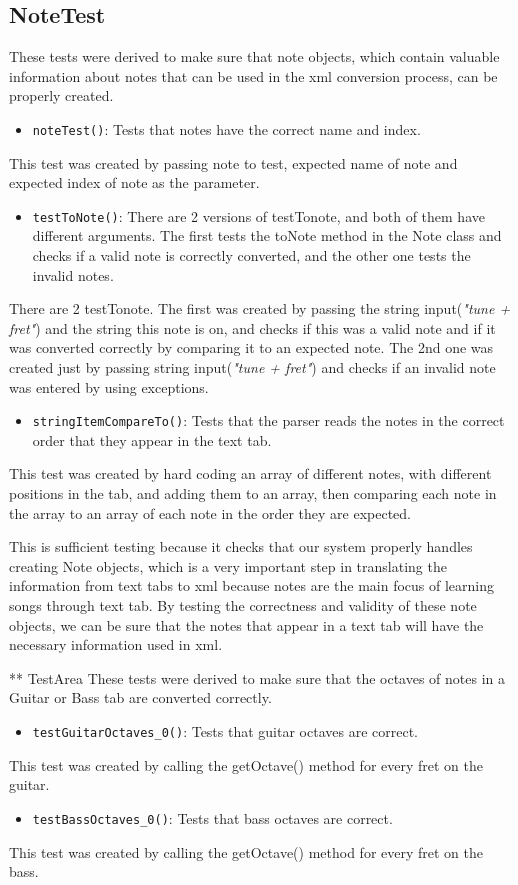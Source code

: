 \documentclass[11pt]{article}
\begin{document}
\subsection{NoteTest}
\label{sec:org2520dad}
These tests were derived to make sure that note objects, which contain valuable information about notes that can be used in the xml conversion process, can be properly created. 
\begin{itemize}
\item \texttt{noteTest()}: Tests that notes have the correct name and index.
\end{itemize}
This test was created by passing note to test, expected name of note and expected index of note as the parameter.
\begin{itemize}
\item \texttt{testToNote()}: There are 2 versions of testTonote, and both of them have different arguments. The first tests the toNote method in the Note class and checks if a valid note is correctly converted, and the other one tests the invalid notes.
\end{itemize}
There are 2 testTonote. The first was created by passing the string input(\emph{"tune + fret"}) and the string this note is on, and checks if this was a valid note and if it was converted correctly by comparing it to an expected note. The 2nd one was created just by passing string input(\emph{"tune + fret"}) and checks if an invalid note was entered by using exceptions.
\begin{itemize}
\item \texttt{stringItemCompareTo()}: Tests that the parser reads the notes in the correct order that they appear in the text tab.
\end{itemize}
This test was created by hard coding an array of different notes, with different positions in the tab, and adding them to an array, then comparing each note in the array to an array of each note in the order they are expected.

This is sufficient testing because it checks that our system properly handles creating Note objects, which is a very important step in translating the information from text tabs to xml because notes are the main focus of learning songs through text tab. By testing the correctness and validity of these note objects, we can be sure that the notes that appear in a text tab will have the necessary information used in xml.

** TestArea
These tests were derived to make sure that the octaves of notes in a Guitar or Bass tab are converted correctly.
\begin{itemize}
\item \texttt{testGuitarOctaves\_0()}: Tests that guitar octaves are correct.
\end{itemize}
This test was created by calling the getOctave() method for every fret on the guitar.
\begin{itemize}
\item \texttt{testBassOctaves\_0()}: Tests that bass octaves are correct.
\end{itemize}
This test was created by calling the getOctave() method for every fret on the bass.
\end{document}

